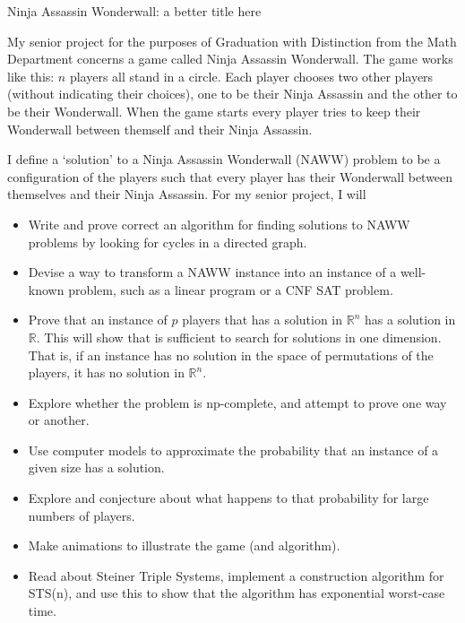 \documentclass{article}
\begin{document}
\begin{center}
\begin{Large}
Ninja Assassin Wonderwall: a better title here
\end{Large}
\end{center}
My senior project for the purposes of Graduation with Distinction from the Math Department concerns a game called Ninja Assassin Wonderwall. The game works like this: $n$ players all stand in a circle. Each player chooses two other players  (without indicating their choices), one to be their Ninja Assassin and the other to be their Wonderwall. When the game starts every player tries to keep their Wonderwall between themself and their Ninja Assassin. 

I define a `solution' to a Ninja Assassin Wonderwall (NAWW) problem to be a configuration of the players such that every player has their Wonderwall between themselves and their Ninja Assassin. For my senior project, I will 

\begin{itemize}
    \item Write and prove correct an algorithm for finding solutions to NAWW problems by looking for cycles in a directed graph.
    \item Devise a way to transform a NAWW instance into an instance of a well-known problem, such as a linear program or a CNF SAT problem.
    \item Prove that an instance of $p$ players that has a solution in $\mathbb{R}^n$ has a solution in $\mathbb{R}$. This will show that is sufficient to search for solutions in one dimension. That is, if an instance has no solution in the space of permutations of the players, it has no solution in $\mathbb{R}^n$.
    \item Explore whether the problem is np-complete, and attempt to prove one way or another.
    \item Use computer models to approximate the probability that an instance of a given size has a solution.
    \item Explore and conjecture about what happens to that probability for large numbers of players.
    \item Make animations to illustrate the game (and algorithm).
    \item Read about Steiner Triple Systems, implement a construction algorithm for STS(n), and use this to show that the algorithm has exponential worst-case time.
\end{itemize}
\end{document}
